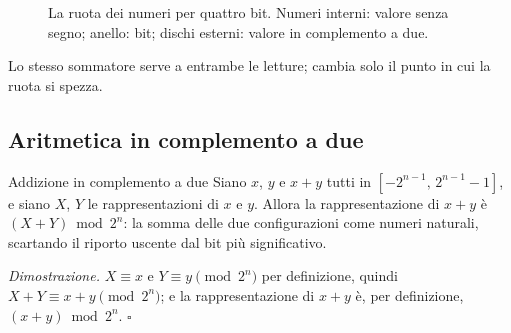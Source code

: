 \begin{figure}[htb]
\centering
{}
\caption{La ruota dei numeri per quattro bit. Numeri interni: valore senza segno; anello:
bit; dischi esterni: valore in complemento a due.}
\label{fig:int:wheel}
\end{figure}

Lo stesso sommatore serve a entrambe le letture; cambia solo il punto in cui la
ruota si spezza.

\subsection{Aritmetica in complemento a due}

\begin{theorem}{Addizione in complemento a due}
Siano $x$, $y$ e $x+y$ tutti in $[-2^{n-1},\,2^{n-1}-1]$, e siano $X$, $Y$ le
rappresentazioni di $x$ e $y$. Allora la rappresentazione di $x+y$ è
$(X+Y)\bmod 2^{n}$: la somma delle due configurazioni come numeri naturali,
scartando il riporto uscente dal bit più significativo.
\end{theorem}

\noindent\emph{Dimostrazione.} $X\equiv x$ e $Y\equiv y \pmod{2^{n}}$ per
definizione, quindi $X+Y\equiv x+y \pmod{2^{n}}$; e la rappresentazione di
$x+y$ è, per definizione, $(x+y)\bmod 2^{n}$. \hfill$\square$

